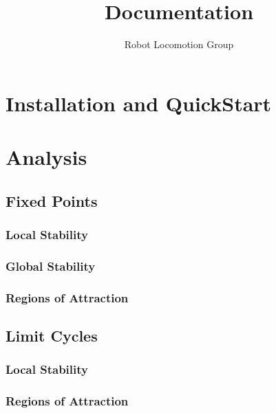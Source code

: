 \documentclass{book}
\title{\Huge \robotlib Documentation}
\author{\Large Robot Locomotion Group}
\begin{document}
\maketitle

\tableofcontents 




\chapter{Installation and QuickStart}




\chapter{Analysis}

\section{Fixed Points}

\subsection{Local Stability}

\subsection{Global Stability}

\subsection{Regions of Attraction}

\section{Limit Cycles}

\subsection{Local Stability}

\subsection{Regions of Attraction}
\end{document}
